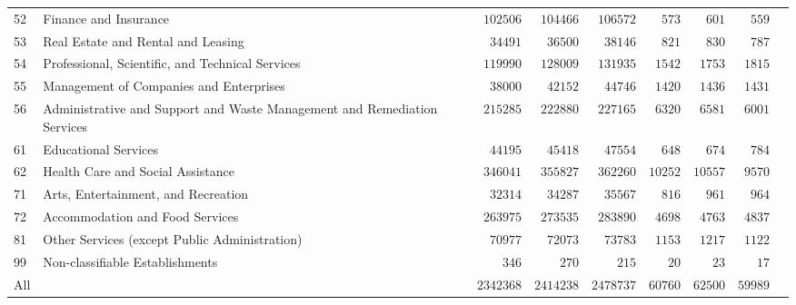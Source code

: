 \documentclass[9pt, oneside]{article}   	%
\begin{document}
\begin{longtable}{lp{3 in}ccccccc}
52  & Finance and Insurance & $\phantom{0}102506$ & $\phantom{0}104466$ & $\phantom{0}106572$ & $\phantom{00}573$ & $\phantom{00}601$ & $\phantom{00}559$ \\
53  & Real Estate and Rental and Leasing & $\phantom{00}34491$ & $\phantom{00}36500$ & $\phantom{00}38146$ & $\phantom{00}821$ & $\phantom{00}830$ & $\phantom{00}787$ \\
54  & Professional, Scientific, and Technical Services & $\phantom{0}119990$ & $\phantom{0}128009$ & $\phantom{0}131935$ & $\phantom{0}1542$ & $\phantom{0}1753$ & $\phantom{0}1815$ \\
55  & Management of Companies and Enterprises & $\phantom{00}38000$ & $\phantom{00}42152$ & $\phantom{00}44746$ & $\phantom{0}1420$ & $\phantom{0}1436$ & $\phantom{0}1431$ \\
56  & Administrative and Support and Waste Management and Remediation Services & $\phantom{0}215285$ & $\phantom{0}222880$ & $\phantom{0}227165$ & $\phantom{0}6320$ & $\phantom{0}6581$ & $\phantom{0}6001$ \\
61  & Educational Services & $\phantom{00}44195$ & $\phantom{00}45418$ & $\phantom{00}47554$ & $\phantom{00}648$ & $\phantom{00}674$ & $\phantom{00}784$ \\
62  & Health Care and Social Assistance & $\phantom{0}346041$ & $\phantom{0}355827$ & $\phantom{0}362260$ & $10252$ & $10557$ & $\phantom{0}9570$ \\
71  & Arts, Entertainment, and Recreation & $\phantom{00}32314$ & $\phantom{00}34287$ & $\phantom{00}35567$ & $\phantom{00}816$ & $\phantom{00}961$ & $\phantom{00}964$ \\
72  & Accommodation and Food Services & $\phantom{0}263975$ & $\phantom{0}273535$ & $\phantom{0}283890$ & $\phantom{0}4698$ & $\phantom{0}4763$ & $\phantom{0}4837$ \\
81  & Other Services (except Public Administration) & $\phantom{00}70977$ & $\phantom{00}72073$ & $\phantom{00}73783$ & $\phantom{0}1153$ & $\phantom{0}1217$ & $\phantom{0}1122$ \\
99  & Non-classifiable Establishments & $\phantom{0000}346$ & $\phantom{0000}270$ & $\phantom{0000}215$ & $\phantom{000}20$ & $\phantom{000}23$ & $\phantom{000}17$ \\
\cline{1-1} \cline{2-2} \cline{3-3} \cline{4-4} \cline{5-5} \cline{6-6} \cline{7-7} \cline{8-8} \cline{9-9} %
All  & & $2342368$ & $2414238$ & $2478737$ & $60760$ & $62500$ & $59989$ \\
\hline 
\end{longtable}
\end{document}
